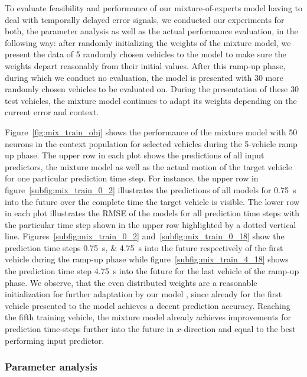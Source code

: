To evaluate feasibility and performance of our mixture-of-experts model having to deal with temporally delayed error signals, we conducted our experiments for both, the parameter analysis as well as the actual performance evaluation, in the following way:
after randomly initializing the weights of the mixture model, we present the data of \num{5} randomly chosen vehicles to the model to make sure the weights depart reasonably from their initial values.
After this ramp-up phase, during which we conduct no evaluation, the model is presented with \num{30} more randomly chosen vehicles to be evaluated on.
During the presentation of these \num{30} test vehicles, the mixture model continues to adapt its weights depending on the current error and context.

Figure~\ref{fig:mix_train_obj} shows the performance of the mixture model with \num{50} neurons in the context population for selected vehicles during the \num{5}-vehicle ramp up phase.
The upper row in each plot shows the predictions of all input predictors, the mixture model as well as the actual motion of the target vehicle for one particular prediction time step.
For instance, the upper row in figure~\ref{subfig:mix_train_0_2} illustrates the predictions of all models for \SI{0.75}{\second} into the future over the complete time the target vehicle is visible.
The lower row in each plot illustrates the \ac{RMSE} of the models for all prediction time steps with the particular time step shown in the upper row highlighted by a dotted vertical line.
Figures~\ref{subfig:mix_train_0_2} and~\ref{subfig:mix_train_0_18} show the prediction time steps \SIlist{0.75;4.75}{\second} into the future respectively of the first vehicle during the ramp-up phase while figure~\ref{subfig:mix_train_4_18} shows the prediction time step \SI{4.75}{\second} into the future for the last vehicle of the ramp-up phase.
We observe, that the even distributed weights are a reasonable initialization for further adaptation by our model , since already for the first vehicle presented to the model achieves a decent prediction accuracy.
Reaching the fifth training vehicle, the mixture model already achieves improvements for prediction time-steps further into the future in $x$-direction and equal to the best performing input predictor.

\subsubsection{Parameter analysis}%
\label{ssubsec:parameter_analysis}

